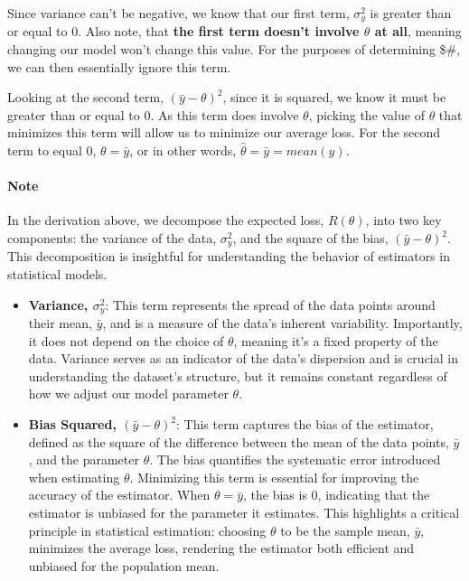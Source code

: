 \documentclass[
  letterpaper,
  DIV=11,
  numbers=noendperiod]{scrreprt}
\let\oldparagraph\paragraph
\renewcommand{\paragraph}[1]{\oldparagraph{#1}\mbox{}}
\begin{document}
Since variance can't be negative, we know that our first term,
\(\sigma_y^2\) is greater than or equal to \(0\). Also note, that
\textbf{the first term doesn't involve \(\theta\) at all}, meaning
changing our model won't change this value. For the purposes of
determining \$\hat{\theta}\#, we can then essentially ignore this term.

Looking at the second term, \((\bar{y} - \theta)^2\), since it is
squared, we know it must be greater than or equal to \(0\). As this term
does involve \(\theta\), picking the value of \(\theta\) that minimizes
this term will allow us to minimize our average loss. For the second
term to equal \(0\), \(\theta = \bar{y}\), or in other words,
\(\hat{\theta} = \bar{y} = mean(y)\).

\paragraph{Note}\label{note}

In the derivation above, we decompose the expected loss, \(R(\theta)\),
into two key components: the variance of the data, \(\sigma_y^2\), and
the square of the bias, \((\bar{y} - \theta)^2\). This decomposition is
insightful for understanding the behavior of estimators in statistical
models.

\begin{itemize}
\item
  \textbf{Variance, \(\sigma_y^2\)}: This term represents the spread of
  the data points around their mean, \(\bar{y}\), and is a measure of
  the data's inherent variability. Importantly, it does not depend on
  the choice of \(\theta\), meaning it's a fixed property of the data.
  Variance serves as an indicator of the data's dispersion and is
  crucial in understanding the dataset's structure, but it remains
  constant regardless of how we adjust our model parameter \(\theta\).
\item
  \textbf{Bias Squared, \((\bar{y} - \theta)^2\)}: This term captures
  the bias of the estimator, defined as the square of the difference
  between the mean of the data points, \(\bar{y}\), and the parameter
  \(\theta\). The bias quantifies the systematic error introduced when
  estimating \(\theta\). Minimizing this term is essential for improving
  the accuracy of the estimator. When \(\theta = \bar{y}\), the bias is
  \(0\), indicating that the estimator is unbiased for the parameter it
  estimates. This highlights a critical principle in statistical
  estimation: choosing \(\theta\) to be the sample mean, \(\bar{y}\),
  minimizes the average loss, rendering the estimator both efficient and
  unbiased for the population mean.
\end{itemize}
\end{document}
